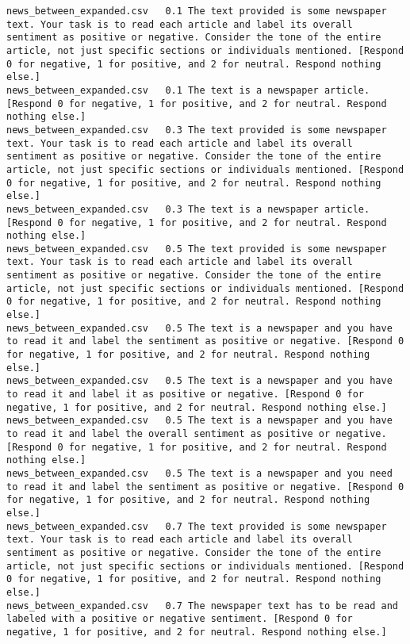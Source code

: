 \begin{lstlisting}[label=lst:promptvariants]
news_between_expanded.csv	0.1	The text provided is some newspaper text. Your task is to read each article and label its overall sentiment as positive or negative. Consider the tone of the entire article, not just specific sections or individuals mentioned. [Respond 0 for negative, 1 for positive, and 2 for neutral. Respond nothing else.]
news_between_expanded.csv	0.1	The text is a newspaper article. [Respond 0 for negative, 1 for positive, and 2 for neutral. Respond nothing else.]
news_between_expanded.csv	0.3	The text provided is some newspaper text. Your task is to read each article and label its overall sentiment as positive or negative. Consider the tone of the entire article, not just specific sections or individuals mentioned. [Respond 0 for negative, 1 for positive, and 2 for neutral. Respond nothing else.]
news_between_expanded.csv	0.3	The text is a newspaper article. [Respond 0 for negative, 1 for positive, and 2 for neutral. Respond nothing else.]
news_between_expanded.csv	0.5	The text provided is some newspaper text. Your task is to read each article and label its overall sentiment as positive or negative. Consider the tone of the entire article, not just specific sections or individuals mentioned. [Respond 0 for negative, 1 for positive, and 2 for neutral. Respond nothing else.]
news_between_expanded.csv	0.5	The text is a newspaper and you have to read it and label the sentiment as positive or negative. [Respond 0 for negative, 1 for positive, and 2 for neutral. Respond nothing else.]
news_between_expanded.csv	0.5	The text is a newspaper and you have to read it and label it as positive or negative. [Respond 0 for negative, 1 for positive, and 2 for neutral. Respond nothing else.]
news_between_expanded.csv	0.5	The text is a newspaper and you have to read it and label the overall sentiment as positive or negative. [Respond 0 for negative, 1 for positive, and 2 for neutral. Respond nothing else.]
news_between_expanded.csv	0.5	The text is a newspaper and you need to read it and label the sentiment as positive or negative. [Respond 0 for negative, 1 for positive, and 2 for neutral. Respond nothing else.]
news_between_expanded.csv	0.7	The text provided is some newspaper text. Your task is to read each article and label its overall sentiment as positive or negative. Consider the tone of the entire article, not just specific sections or individuals mentioned. [Respond 0 for negative, 1 for positive, and 2 for neutral. Respond nothing else.]
news_between_expanded.csv	0.7	The newspaper text has to be read and labeled with a positive or negative sentiment. [Respond 0 for negative, 1 for positive, and 2 for neutral. Respond nothing else.]

\end{lstlisting}
